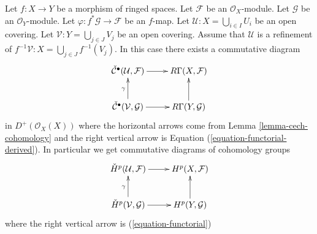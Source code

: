 \begin{lemma}
\label{lemma-functoriality-cech}
Let $f : X \to Y$ be a morphism of ringed spaces.
Let $\mathcal{F}$ be an $\mathcal{O}_X$-module.
Let $\mathcal{G}$ be an $\mathcal{O}_Y$-module.
Let $\varphi : f^*\mathcal{G} \to \mathcal{F}$ be an $f$-map.
Let $\mathcal{U} : X = \bigcup_{i \in I} U_i$ be an open covering.
Let $\mathcal{V} : Y = \bigcup_{j \in J} V_j$ be an open covering.
Assume that $\mathcal{U}$ is a refinement of
$f^{-1}\mathcal{V} : X = \bigcup_{j \in J} f^{-1}(V_j)$.
In this case there exists a commutative diagram
$$
\xymatrix{
\check{\mathcal{C}}^\bullet(\mathcal{U}, \mathcal{F}) \ar[r] &
R\Gamma(X, \mathcal{F}) \\
\check{\mathcal{C}}^\bullet(\mathcal{V}, \mathcal{G}) \ar[r]
\ar[u]^\gamma &
R\Gamma(Y, \mathcal{G}) \ar[u]
}
$$
in $D^{+}(\mathcal{O}_X(X))$ where the 
horizontal arrows come from Lemma \ref{lemma-cech-cohomology}
and the right vertical arrow is Equation (\ref{equation-functorial-derived}).
In particular we get commutative diagrams of cohomology groups
$$
\xymatrix{
\check{H}^p(\mathcal{U}, \mathcal{F}) \ar[r] &
H^p(X, \mathcal{F}) \\
\check{H}^p(\mathcal{V}, \mathcal{G}) \ar[r]
\ar[u]^\gamma &
H^p(Y, \mathcal{G}) \ar[u]
}
$$
where the right vertical arrow is (\ref{equation-functorial})
\end{lemma}

